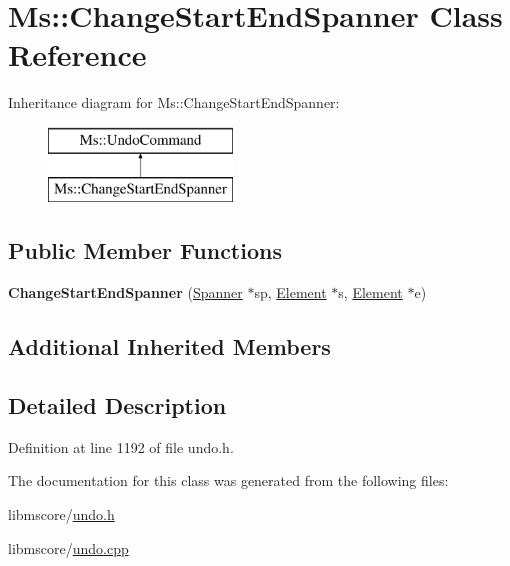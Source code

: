 \hypertarget{class_ms_1_1_change_start_end_spanner}{}\section{Ms\+:\+:Change\+Start\+End\+Spanner Class Reference}
\label{class_ms_1_1_change_start_end_spanner}
Inheritance diagram for Ms\+:\+:Change\+Start\+End\+Spanner\+:\begin{figure}[H]
\begin{center}
\leavevmode
\includegraphics[height=2.000000cm]{class_ms_1_1_change_start_end_spanner}
\end{center}
\end{figure}
\subsection*{Public Member Functions}
\begin{DoxyCompactItemize}
\item 
\mbox{\label{class_ms_1_1_change_start_end_spanner_af1df788b6b000c3680dfdc82642c7f47}} 
{\bfseries Change\+Start\+End\+Spanner} (\hyperlink{class_ms_1_1_spanner}{Spanner} $\ast$sp, \hyperlink{class_ms_1_1_element}{Element} $\ast$s, \hyperlink{class_ms_1_1_element}{Element} $\ast$e)
\end{DoxyCompactItemize}
\subsection*{Additional Inherited Members}


\subsection{Detailed Description}


Definition at line 1192 of file undo.\+h.



The documentation for this class was generated from the following files\+:\begin{DoxyCompactItemize}
\item 
libmscore/\hyperlink{undo_8h}{undo.\+h}\item 
libmscore/\hyperlink{undo_8cpp}{undo.\+cpp}\end{DoxyCompactItemize}
